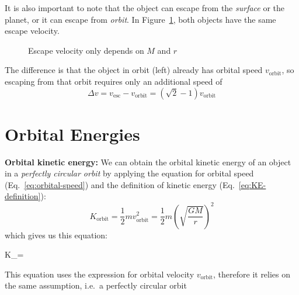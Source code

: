 It is also important to note that the object can escape from the \emph{surface}
or the planet, or it can escape from \emph{orbit}.
In Figure~\ref{fig:two-escapes}, both objects have the same escape velocity.
\begin{figure}[ht]
  \centering
  \begin{subfigure}{.4\linewidth}
    \centering
  \end{subfigure}
  \begin{subfigure}{.4\linewidth}
    \centering
  \end{subfigure}
  \caption{Escape velocity only depends on $M$ and $r$}
  \label{fig:two-escapes}
\end{figure}
The difference is that the object in orbit (left) already has orbital speed
$v_\text{orbit}$, so escaping from that orbit requires only an additional
speed of
\begin{equation}
  \Delta v=v_\text{esc}-v_\text{orbit}=(\sqrt2-1)v_\text{orbit}
\end{equation}



\section{Orbital Energies}

\textbf{Orbital kinetic energy:} We can obtain the orbital kinetic energy of an
object in a \emph{perfectly circular orbit} by applying the equation for
orbital speed (Eq.~\ref{eq:orbital-speed}) and the definition of kinetic
energy (Eq.~\ref{eq:KE-definition}):
\begin{equation}
  K_\text{orbit}=\frac12mv_\text{orbit}^2=\frac12m
  \left(\sqrt{\frac{GM}r}\right)^2
\end{equation}
which gives us this equation:
\begin{important-equation}
  K_=
  \label{eq:orbital-KE}
\end{important-equation}
This equation uses the expression for orbital velocity $v_\text{orbit}$,
therefore it relies on the same assumption, i.e.\ a perfectly circular orbit



